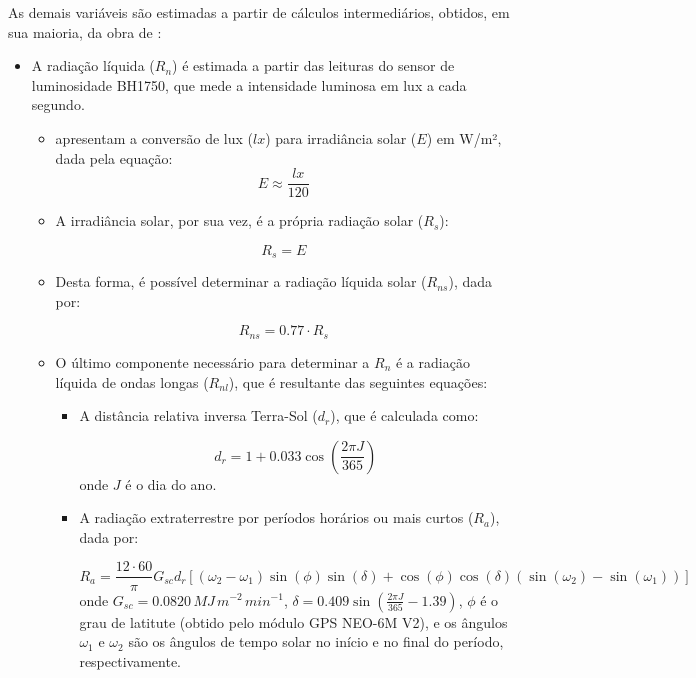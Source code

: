 As demais variáveis são estimadas a partir de cálculos intermediários, obtidos, em sua maioria, da obra de \textcite{Allen_evapotranspiration1998}:
\begin{itemize}
    \item A radiação líquida (\(R_n\)) é estimada a partir das leituras do sensor de luminosidade BH1750, que mede a intensidade luminosa em lux a cada segundo. 
    \begin{itemize}
        \item \textcite{Michael_2020} apresentam a conversão de lux (\(lx\)) para irradiância solar (\(E\)) em W/m², dada pela equação:
        \[ E \approx \frac{lx}{120} \]

        \item A irradiância solar, por sua vez, é a própria radiação solar (\(R_s\)):
        
        \[ R_s = E \]

        \item Desta forma, é possível determinar a radiação líquida solar (\(R_{ns}\)), dada por:
        
        \[ R_{ns} = 0.77 \cdot R_s \]

        \item O último componente necessário para determinar a \(R_n\) é a radiação líquida de ondas longas (\(R_{nl}\)), que é resultante das seguintes equações:
        
        \begin{itemize}
            \item A distância relativa inversa Terra-Sol (\(d_r\)), que é calculada como:
            
            \[
            d_r = 1 + 0.033 \cos\left( \frac{2 \pi J}{365} \right)
            \]
            onde \(J\) é o dia do ano.
            
            \item A radiação extraterrestre por períodos horários ou mais curtos (\(R_a\)), dada por:
            
            \[
            R_a = \frac{12 \cdot 60}{\pi} G_{sc} d_r 
            \left[ 
            (\omega_2 - \omega_1) \sin(\phi) \sin(\delta) + 
            \cos(\phi) \cos(\delta) (\sin(\omega_2) - \sin(\omega_1)) 
            \right]
            \]
            onde \(G_{sc} = 0.0820 \, MJ \, m^{-2} \, min^{-1}\), \( \delta = 0.409 \sin\left( \frac{2 \pi J}{365} - 1.39 \right)\), \(\phi\) é o grau de latitute (obtido pelo módulo GPS NEO-6M V2), e os ângulos \( \omega_1 \) e \( \omega_2 \) são os ângulos de tempo solar no início e no final do período, respectivamente.
            

\end{itemize}
\end{itemize}
\end{itemize}
